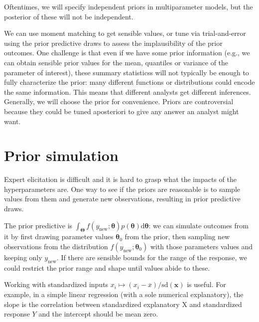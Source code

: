 \documentclass[
  11pt,
  letterpaper,
]{scrbook}
\theoremstyle{definition}
\theoremstyle{plain}
\theoremstyle{plain}
\theoremstyle{definition}
\theoremstyle{definition}
\theoremstyle{remark}
\begin{document}
Oftentimes, we will specify independent priors in multiparameter models,
but the posterior of these will not be independent.

We can use moment matching to get sensible values, or tune via
trial-and-error using the prior predictive draws to assess the
implausibility of the prior outcomes. One challenge is that even if we
have some prior information (e.g., we can obtain sensible prior values
for the mean, quantiles or variance of the parameter of interest), these
summary statisticss will not typically be enough to fully characterize
the prior: many different functions or distributions could encode the
same information. This means that different analysts get different
inferences. Generally, we will choose the prior for convenience. Priors
are controversial because they could be tuned aposteriori to give any
answer an analyst might want.

\section{Prior simulation}\label{prior-simulation}

Expert elicitation is difficult and it is hard to grasp what the impacts
of the hyperparameters are. One way to see if the priors are reasonable
is to sample values from them and generate new observations, resulting
in prior predictive draws.

The prior predictive is
\(\int_{\boldsymbol{\Theta}} f(y_{\text{new}}; \boldsymbol{\theta}) p(\boldsymbol{\theta}) \mathrm{d} \boldsymbol{\theta}\):
we can simulate outcomes from it by first drawing parameter values
\(\boldsymbol{\theta}_0\) from the prior, then sampling new observations
from the distribution \(f(y_{\text{new}}; \boldsymbol{\theta}_0)\) with
those parameters values and keeping only \(y_{\text{new}}.\) If there
are sensible bounds for the range of the response, we could restrict the
prior range and shape until values abide to these.

Working with standardized inputs
\(x_i \mapsto (x_i - \overline{x})/\mathrm{sd}(\boldsymbol{x})\) is
useful. For example, in a simple linear regression (with a sole
numerical explanatory), the slope is the correlation between
standardized explanatory \(\mathrm{X}\) and standardized response \(Y\)
and the intercept should be mean zero.
\end{document}

